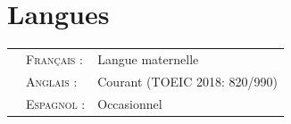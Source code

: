 \documentclass[a4paper,10pt]{article}
\begin{document}
\section{Langues}
\begin{flushleft}
\begin{tabular}{p{0.05cm}ll}
&\textsc{Français :}&Langue maternelle\\
&\textsc{Anglais :}&Courant (TOEIC 2018: 820/990)\\
&\textsc{Espagnol :}&Occasionnel
\end{tabular}
\end{flushleft}

\end{document}
